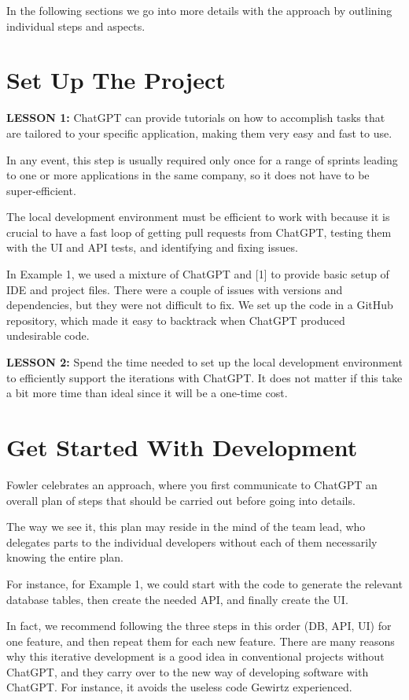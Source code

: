 \documentclass[runningheads]{llncs}
\begin{document}
In the following sections we go into more details with the approach by outlining individual steps and aspects.

\section{Set Up The Project}
\textbf{LESSON 1:} ChatGPT can provide tutorials on how to accomplish tasks that are tailored to your specific application, making them very easy and fast to use.

In any event, this step is usually required only once for a range of sprints leading to one or more applications in the same company, so it does not have to be super-efficient.

The local development environment must be efficient to work with because it is crucial to have a fast loop of getting pull requests from ChatGPT, testing them with the UI and API tests, and identifying and fixing issues.

In Example 1, we used a mixture of ChatGPT and [1] to provide basic setup of IDE and project files. There were a couple of issues with versions and dependencies, but they were not difficult to fix. We set up the code in a GitHub repository, which made it easy to backtrack when ChatGPT produced undesirable code.

\textbf{LESSON 2:} Spend the time needed to set up the local development environment to efficiently support the iterations with ChatGPT. It does not matter if this take a bit more time than ideal since it will be a one-time cost.

\section{Get Started With Development}
Fowler\cite{Fowler2023} celebrates an approach, where you first communicate to ChatGPT an overall plan of steps that should be carried out before going into details.

The way we see it, this plan may reside in the mind of the team lead, who delegates parts to the individual developers without each of them necessarily knowing the entire plan.

For instance, for Example 1, we could start with the code to generate the relevant database tables, then create the needed API, and finally create the UI.

In fact, we recommend following the three steps in this order (DB, API, UI) for one feature, and then repeat them for each new feature. There are many reasons why this iterative development is a good idea in conventional projects without ChatGPT, and they carry over to the new way of developing software with ChatGPT. For instance, it avoids the useless code Gewirtz\cite{Gewirtz2023a} experienced.
\end{document}
